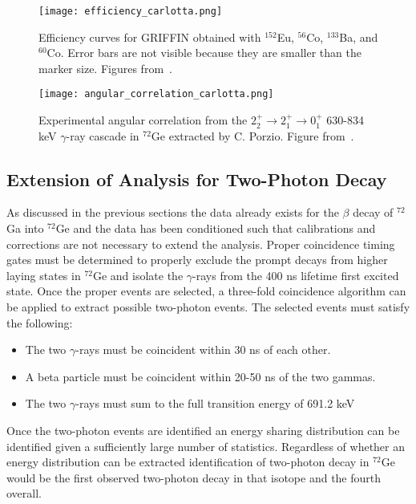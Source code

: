 \documentclass[cnatzke_thesis_proposal.tex]{subfiles}
\begin{document}
\begin{figure}[htbp]
  \centering
  \texttt{[image: efficiency\_carlotta.png]}
  \caption{Efficiency curves for GRIFFIN obtained with $^{152}$Eu, $^{56}$Co, $^{133}$Ba, and $^{60}$Co. Error bars are not visible because they are smaller than the marker size. Figures from~\cite{porzio_configuration_2021}.}
  \label{fig:efficiency_carlotta}
\end{figure}

\begin{figure}[htbp]
  \centering
  \texttt{[image: angular\_correlation\_carlotta.png]}
  \caption{Experimental angular correlation from the $2_2^+ \rightarrow 2_1^+ \rightarrow 0_1^+$ 630-834 keV $\gamma$-ray cascade in $^{72}$Ge extracted by C. Porzio. Figure from~\cite{porzio_configuration_2021}.}
  \label{fig:angular_correlation_carlotta}
\end{figure}


\subsection{Extension of Analysis for Two-Photon Decay}
As discussed in the previous sections the data already exists for the $\beta$ decay of $^{72}$Ga into $^{72}$Ge and the data has been conditioned such that calibrations and corrections are not necessary to extend the analysis. 
Proper coincidence timing gates must be determined to properly exclude the prompt decays from higher laying states in $^{72}$Ge and isolate the $\gamma$-rays from the 400 ns lifetime first excited state. 
Once the proper events are selected, a three-fold coincidence algorithm can be applied to extract possible two-photon events. 
The selected events must satisfy the following: 

\begin{itemize}
  \item The two $\gamma$-rays must be coincident within 30 ns of each other.
  \item A beta particle must be coincident within 20-50 ns of the two gammas.
  \item The two $\gamma$-rays must sum to the full transition energy of 691.2 keV
\end{itemize}

Once the two-photon events are identified an energy sharing distribution can be identified given a sufficiently large number of statistics. 
Regardless of whether an energy distribution can be extracted identification of two-photon decay in $^{72}$Ge would be the first observed two-photon decay in that isotope and the fourth overall. 


\end{document}
